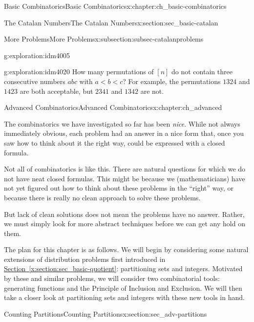 \documentclass[oneside,10pt,]{book}
\numberwithin{equation}{chapter}
\newcommand{\lt}{<}
\begin{document}
\begin{chapterptx}{Basic Combinatorics}{}{Basic Combinatorics}{}{}{x:chapter:ch_basic-combinatorics}
\begin{sectionptx}{The Catalan Numbers}{}{The Catalan Numbers}{}{}{x:section:sec_basic-catalan}
\begin{subsectionptx}{More Problems}{}{More Problems}{}{}{x:subsection:subsec-catalanproblems}
\begin{exploration}{}{g:exploration:idm4005}
\end{exploration}
\begin{exploration}{}{g:exploration:idm4020}%
How many permutations of \([n]\) do not contain three consecutive numbers \(abc\) with \(a \lt b \lt c\)?  For example, the permutations \(1324\) and \(1423\) are both acceptable, but \(2341\) and \(1342\) are not.%
\end{exploration}
\end{subsectionptx}
\end{sectionptx}
\end{chapterptx}
%
%
\typeout{************************************************}
\typeout{************************************************}
%
\begin{chapterptx}{Advanced Combinatorics}{}{Advanced Combinatorics}{}{}{x:chapter:ch_advanced}
\begin{introduction}{}%
The combinatorics we have investigated so far has been \emph{nice}.  While not always immediately obvious, each problem had an answer in a nice form that, once you saw how to think about it the right way, could be expressed with a closed formula.%
\par
Not all of combinatorics is like this.  There are natural questions for which we do not have neat closed formulas.  This might be because we (mathematicians) have not yet figured out how to think about these problems in the ``right'' way, or because there is really no clean approach to solve these problems.%
\par
But lack of clean solutions does not mean the problems have no answer.  Rather, we must simply look for more abstract techniques before we can get any hold on them.%
\par
The plan for this chapter is as follows.  We will begin by considering some natural extensions of distribution problems first introduced in \hyperref[x:section:sec_basic-quotient]{Section~\ref{x:section:sec_basic-quotient}}: partitioning sets and integers.  Motivated by these and similar problems, we will consider two combinatorial tools: generating functions and the Principle of Inclusion and Exclusion.  We will then take a closer look at partitioning sets and integers with these new tools in hand.%
\end{introduction}%
%
%
\typeout{************************************************}
\typeout{************************************************}
%
\begin{sectionptx}{Counting Partitions}{}{Counting Partitions}{}{}{x:section:sec_adv-partitions}

\end{sectionptx}
\end{chapterptx}
\end{document}
